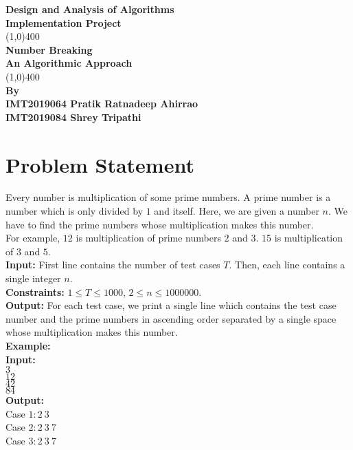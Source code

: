 \documentclass[11pt]{article}
\begin{document}
\begin{titlepage}
\begin{center}
\vspace*{0.5cm}
\Large{\textbf{Design and Analysis of Algorithms}}\\
\Large{\textbf{Implementation Project}}\\
\vfill
\line(1,0){400}\\[1mm]
\huge{\textbf{Number Breaking}}\\[3mm]
\Large{\textbf{An Algorithmic Approach}}\\[1mm]
\line(1,0){400}\\
\vfill
\textbf{By} \\ 
\textbf{IMT2019064 Pratik Ratnadeep Ahirrao} \\
\textbf{IMT2019084 Shrey Tripathi} \\
\end{center}
\end{titlepage}

\setcounter{page}{1}

\section{Problem Statement}
Every number is multiplication of some prime numbers. A prime number is a number which is only divided by $1$ and itself. Here, we are given a number $n$. We have to find the prime numbers whose multiplication makes this number.\\
For example, $12$ is multiplication of prime numbers $2$ and $3$. $15$ is multiplication of $3$ and $5$.\\
\textbf{Input:} First line contains the number of test cases $T$. Then, each line contains a single integer $n$.\\
\textbf{Constraints:} $1 \leq T \leq 1000$, $2 \leq n \leq 1000000$.\\
\textbf{Output:} For each test case, we print a single line which contains the test case number and the prime numbers in ascending order separated by a single space whose multiplication makes this number.\\
\textbf{Example:}\\
\textbf{Input:}\\
$3$\\
$12$\\
$42$\\
$84$\\
\textbf{Output:}\\
Case $1: 2\ 3$\\
Case $2: 2\ 3\ 7$\\
Case $3: 2\ 3\ 7$\\
\end{document}
